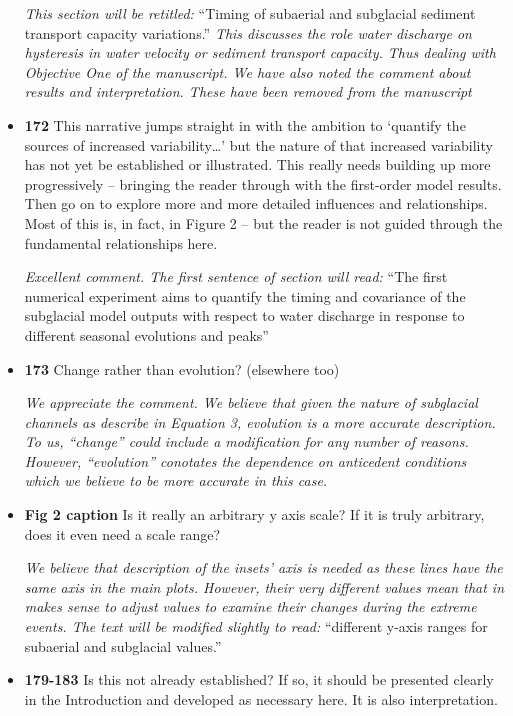 \documentclass[11pt]{article}
\begin{document}
\begin{itemize}
  \textit{This section will be retitled:} ``Timing of subaerial and subglacial sediment transport capacity variations.''
  \textit{This discusses the role water discharge on hysteresis in water velocity or sediment transport capacity. Thus dealing with Objective One of the manuscript. We have also noted the comment about results and interpretation. These have been removed from the manuscript}
  

\item \textbf{172} This narrative jumps straight in with the ambition to ‘quantify the sources
  of increased variability…’ but the nature of that increased variability has not
  yet be established or illustrated. This really needs building up more
  progressively – bringing the reader through with the first-order model
  results. Then go on to explore more and more detailed influences and
  relationships. Most of this is, in fact, in Figure 2 – but the reader is not
  guided through the fundamental relationships here.

 \textit{Excellent comment. The first sentence of section will read:} ``The first numerical experiment aims to quantify the timing and covariance of the subglacial model outputs with respect to water discharge in response to different seasonal evolutions and peaks''

\item \textbf{173} Change rather than evolution? (elsewhere too)

  \textit{We appreciate the comment. We believe that given the nature of subglacial channels as describe in Equation 3, evolution is a more accurate description. To us, ``change'' could include a modification for any number of reasons. However,
    ``evolution'' conotates the dependence on anticedent conditions which we believe to be more accurate in this case. }
  
\item \textbf{Fig 2 caption} Is it really an arbitrary y axis scale? If it is truly arbitrary, does it even need
  a scale range?

  \textit{We believe that description of the insets' axis is needed as these lines have the same axis in the main plots. However, their very different values mean that in makes sense to adjust values to examine their changes during the extreme events. The text will be modified slightly to read:} ``different y-axis ranges for subaerial and subglacial values.''


  
\item \textbf{179-183} Is this not already established? If so, it should be presented clearly in the
  Introduction and developed as necessary here. It is also interpretation.


\end{itemize}
\end{document}
